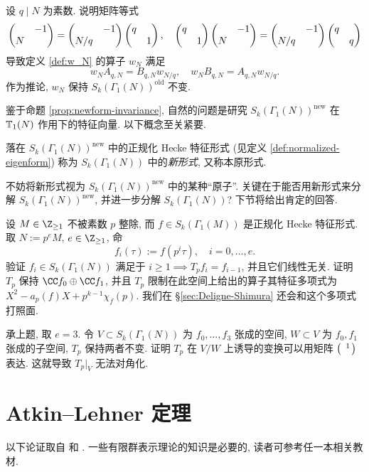 \begin{exercise}\label{exo:wN-old}
	设 $q \mid N$ 为素数. 说明矩阵等式
	\[ \begin{pmatrix}  & -1 \\ N &  \end{pmatrix} = \begin{pmatrix}  & -1 \\ N/q &  \end{pmatrix} \begin{pmatrix} q &  \\  & 1 \end{pmatrix}, \quad \begin{pmatrix} q &  \\  & 1 \end{pmatrix} \begin{pmatrix}  & -1 \\ N &  \end{pmatrix} = \begin{pmatrix}  & -1 \\ N/q &  \end{pmatrix} \begin{pmatrix} q &  \\  & q \end{pmatrix} \]
	导致定义 \ref{def:w_N} 的算子 $w_N$ 满足
	\[ w_N A_{q, N} = B_{q, N} w_{N/q}, \quad w_N B_{q, N} = A_{q, N} w_{N/q}. \]
	作为推论, $w_N$ 保持 $S_k(\Gamma_1(N))^{\text{old}}$ 不变.
\end{exercise}

鉴于命题 \ref{prop:newform-invariance}, 自然的问题是研究 $S_k(\Gamma_1(N))^\text{new}$ 在 $\mathbb{T}_1(N)$ 作用下的特征向量. 以下概念至关紧要.

\begin{definition}[新形式]\label{def:newform} 
	落在 $S_k(\Gamma_1(N))^{\mathrm{new}}$ 中的正规化 Hecke 特征形式 (见定义 \ref{def:normalized-eigenform}) 称为 $S_k(\Gamma_1(N))$ 中的\emph{新形式}, 又称本原形式.
\end{definition}

不妨将新形式视为 $S_k(\Gamma_1(N))^{\mathrm{new}}$ 中的某种``原子''. 关键在于能否用新形式来分解 $S_k(\Gamma_1(N))^{\mathrm{new}}$, 并进一步分解 $S_k(\Gamma_1(N))$? 下节将给出肯定的回答.

\begin{exercise}
	设 $M \in \Z_{\geq 1}$ 不被素数 $p$ 整除, 而 $f \in S_k(\Gamma_1(M))$ 是正规化 Hecke 特征形式. 取 $N := p^e M$, $e \in \Z_{\geq 1}$, 命
	\[ f_i(\tau) := f(p^i \tau), \quad i = 0, \ldots, e. \]
	验证 $f_i \in S_k(\Gamma_1(N))$ 满足于 $i \geq 1 \implies T_p f_i = f_{i-1}$, 并且它们线性无关. 证明 $T_p$ 保持 $\CC f_0 \oplus \CC f_1$, 并且 $T_p$ 限制在此空间上给出的算子其特征多项式为 $X^2 - a_p(f) X + p^{k-1} \chi_f(p)$. 我们在 \S\ref{sec:Deligne-Shimura} 还会和这个多项式打照面.
\end{exercise}

\begin{exercise}\label{exo:non-semisimple-Tp}
	承上题, 取 $e = 3$. 令 $V \subset S_k(\Gamma_1(N))$ 为 $f_0, \ldots, f_3$ 张成的空间, $W \subset V$ 为 $f_0, f_1$ 张成的子空间, $T_p$ 保持两者不变. 证明 $T_p$ 在 $V/W$ 上诱导的变换可以用矩阵 $\bigl(\begin{smallmatrix}  & 1 \\  &  \end{smallmatrix}\bigr)$ 表达. 这就导致 $T_p|_V$ 无法对角化.
\end{exercise}

\section{Atkin--Lehner 定理}\label{sec:AT}
以下论证取自 \cite{Car99} 和 \cite[\S\S 5.6---5.7]{DS05}. 一些有限群表示理论的知识是必要的, 读者可参考任一本相关教材.

